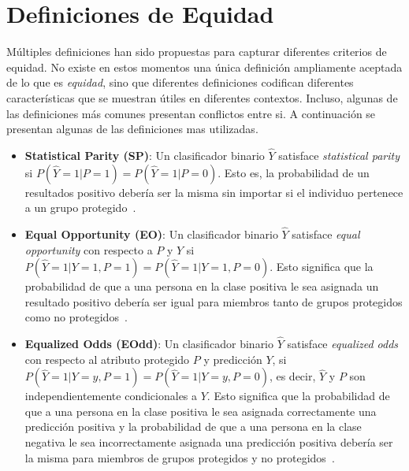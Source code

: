 \section{Definiciones de Equidad}

Múltiples definiciones han sido propuestas para capturar diferentes criterios de equidad.
No existe en estos momentos una única definición ampliamente aceptada de lo que es \textit{equidad}, sino que diferentes definiciones codifican diferentes características que se muestran útiles en diferentes contextos.
Incluso, algunas de las definiciones más comunes presentan conflictos entre si.
A continuación se presentan algunas de las definiciones mas utilizadas. 



 \begin{itemize}
     \item \textbf{Statistical Parity (SP)}: Un clasificador binario $\hat{Y}$ satisface \emph{statistical parity} si $P(\hat{Y}=1|P=1) = P(\hat{Y}=1|P=0)$.
     Esto es, la probabilidad de un resultados positivo debería ser la misma sin importar si el individuo pertenece a un grupo protegido~\parencite{verma2018fairness}.
     \item \textbf{Equal Opportunity (EO)}: Un clasificador binario $\hat{Y}$ satisface \emph{equal opportunity} con respecto a $P$ y $Y$ si $P(\hat{Y}=1|Y=1,P=1) = P(\hat{Y}=1|Y=1,P=0)$.
     Esto significa que la probabilidad de que a una persona en la clase positiva le sea asignada un resultado positivo debería ser igual para miembros tanto de grupos protegidos como no protegidos~\parencite{verma2018fairness}.
     \item \textbf{Equalized Odds (EOdd)}: Un clasificador binario $\hat{Y}$ satisface \emph{equalized odds} con respecto al atributo protegido $P$ y predicción $Y$, si $P(\hat{Y}=1|Y=y,P=1) = P(\hat{Y}=1|Y=y,P=0)$, es decir, $\hat{Y}$ y $P$ son independientemente condicionales a $Y$.
     Esto significa que la probabilidad de que a una persona en la clase positiva le sea asignada correctamente una predicción positiva y la probabilidad de que a una persona en la clase negativa le sea incorrectamente asignada una predicción positiva debería ser la misma para miembros de grupos protegidos y no protegidos~\parencite{verma2018fairness}.
 \end{itemize}

